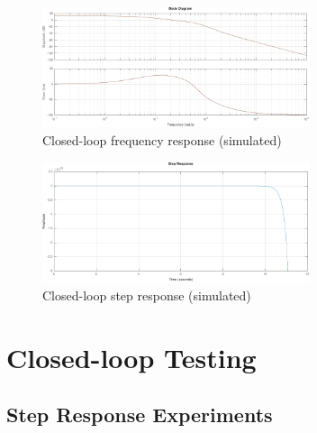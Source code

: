 \documentclass[11pt]{article}
\begin{document}
\begin{figure}
\centering
    \includegraphics[width=0.7\textwidth]{bodecompsense.pdf}
    \caption{Closed-loop frequency response (simulated)}
    \label{fig:bodecompsense}
\end{figure}
\begin{figure}
\centering
    \includegraphics[width=0.7\textwidth]{bodecompsenseStep.pdf}
    \caption{Closed-loop step response (simulated)}
    \label{fig:stepresponse}
\end{figure}

\section{Closed-loop Testing}
\label{sec:closedLoop}


\subsection{Step Response Experiments}
\end{document}
